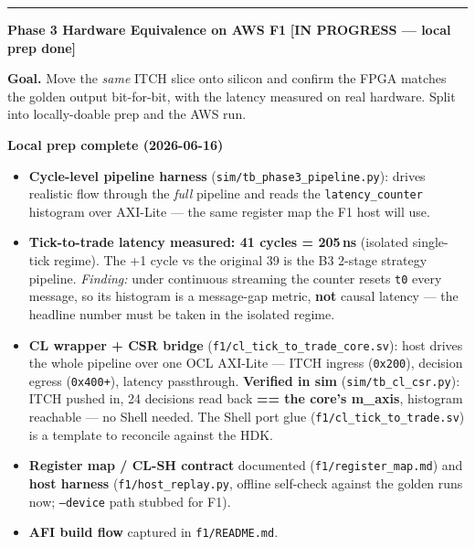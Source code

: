 \documentclass[10pt,a4paper]{article}
\newcommand{\sectionrule}{\vspace{2pt}\textcolor{rulegray}{\rule{\linewidth}{0.8pt}}\vspace{2pt}}
\begin{document}
\sectionrule

{\large\bfseries\color{hdrblue} Phase 3 \textendash{} Hardware Equivalence on AWS F1\quad}%
{\large\color{warnamber}\textbf{[IN PROGRESS — local prep done]}}

\textbf{Goal.} Move the \emph{same} ITCH slice onto silicon and confirm the FPGA
matches the golden output bit-for-bit, with the latency measured on real
hardware. Split into locally-doable prep and the AWS run.

\begin{keybox}
{\bfseries\color{newtext} Local prep complete (2026-06-16)}

\begin{itemize}[leftmargin=1.2em, itemsep=2pt]
  \item \textbf{Cycle-level pipeline harness} (\texttt{sim/tb\_phase3\_pipeline.py}):
        drives realistic flow through the \emph{full} pipeline and reads the
        \texttt{latency\_counter} histogram over AXI-Lite — the same register map
        the F1 host will use.
  \item \textbf{Tick-to-trade latency measured: \textcolor{okgreen}{41 cycles =
        205\,ns}} (isolated single-tick regime). The +1 cycle vs the original
        39 is the B3 2-stage strategy pipeline. \emph{Finding:} under continuous
        streaming the counter resets \texttt{t0} every message, so its histogram
        is a message-gap metric, \textbf{not} causal latency — the headline
        number must be taken in the isolated regime.
  \item \textbf{CL wrapper + CSR bridge} (\texttt{f1/cl\_tick\_to\_trade\_core.sv}):
        host drives the whole pipeline over one OCL AXI-Lite — ITCH ingress
        (\texttt{0x200}), decision egress (\texttt{0x400+}), latency passthrough.
        \textcolor{okgreen}{\textbf{Verified in sim}} (\texttt{sim/tb\_cl\_csr.py}):
        ITCH pushed in, 24 decisions read back \textbf{== the core's m\_axis},
        histogram reachable — no Shell needed. The Shell port glue
        (\texttt{f1/cl\_tick\_to\_trade.sv}) is a template to reconcile against the
        HDK.
  \item \textbf{Register map / CL-SH contract} documented (\texttt{f1/register\_map.md})
        and \textbf{host harness} (\texttt{f1/host\_replay.py}, offline self-check
        against the golden runs now; \texttt{--device} path stubbed for F1).
  \item \textbf{AFI build flow} captured in \texttt{f1/README.md}.
\end{itemize}
\end{keybox}
\end{document}

